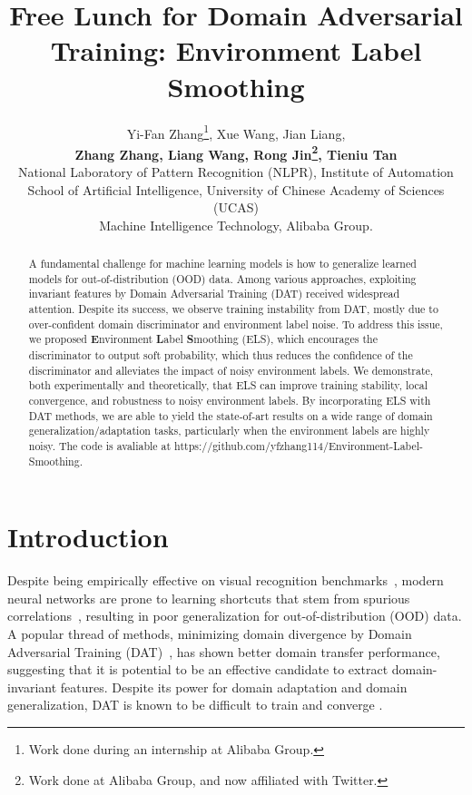 \documentclass{article} \usepackage{iclr2023_conference,times}
\title{Free Lunch for Domain Adversarial Training: Environment Label Smoothing}
\author{Yi-Fan Zhang\thanks{Work done during an internship at Alibaba Group.}, Xue Wang, Jian Liang,
 \\ \textbf{Zhang Zhang, Liang Wang, Rong Jin\thanks{Work done at Alibaba Group, and now affiliated with Twitter.}, Tieniu Tan} \\
National Laboratory of Pattern Recognition (NLPR), Institute of Automation\\
School of Artificial Intelligence, University of Chinese Academy of Sciences (UCAS) \\
 Machine Intelligence Technology, Alibaba Group. 
}
\newcommand{\ls}[0]{ELS\xspace}
\begin{document}
\maketitle

\begin{abstract}
A fundamental challenge for machine learning models is how to generalize learned models for out-of-distribution (OOD) data. Among various approaches, exploiting invariant features by Domain Adversarial Training (DAT) received widespread attention. Despite its success, we observe training instability from DAT, mostly due to over-confident domain discriminator and environment label noise. To address this issue, we proposed \textbf{E}nvironment \textbf{L}abel \textbf{S}moothing (\ls), which  
encourages the discriminator to output soft probability, which thus reduces the confidence of the discriminator and alleviates the impact of noisy environment labels. We demonstrate, both experimentally and theoretically, that \ls can improve training stability, local convergence, and robustness to noisy environment labels. By incorporating \ls with DAT methods, we are able to yield the state-of-art results on a wide range of domain generalization/adaptation tasks, particularly when the environment labels are highly noisy. The code is avaliable at https://github.com/yfzhang114/Environment-Label-Smoothing.





\end{abstract}

\vspace{-0.1cm}
\section{Introduction} 
\vspace{-0.1cm}
Despite being empirically effective on visual recognition benchmarks~\citep{russakovsky2015imagenet}, modern neural networks are prone to learning shortcuts that stem from spurious correlations~\citep{Geirhos_2020}, resulting in poor generalization for out-of-distribution (OOD) data. A popular thread of methods, minimizing domain divergence by Domain Adversarial Training (DAT)~\citep{ganin2016domain}, has shown better domain transfer performance, suggesting that it is potential to be an effective candidate to extract domain-invariant features. Despite its power for domain adaptation and domain generalization, DAT is known to be difficult to train and converge \citep{roth2017stabilizing,jenni2019stabilizing,arjovsky2017towards,sonderby2016amortised}. 
\end{document}

